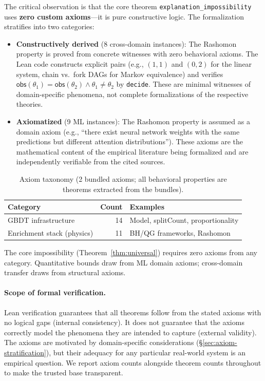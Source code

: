 \documentclass[11pt,a4paper]{article}
\begin{document}
The critical observation is that the core theorem
\texttt{explanation\_impossibility} uses \textbf{zero custom axioms}---it is pure
constructive logic.  The formalization stratifies into two categories:

\begin{itemize}
  \item \textbf{Constructively derived} (8 cross-domain instances): The
    Rashomon property is proved from concrete witnesses with zero behavioral
    axioms.  The Lean code constructs explicit pairs (e.g., $(1,1)$ and
    $(0,2)$ for the linear system, chain vs.\ fork DAGs for Markov
    equivalence) and verifies $\mathsf{obs}(\theta_1) = \mathsf{obs}(\theta_2)
    \wedge \theta_1 \ne \theta_2$ by \texttt{decide}.  These are minimal
    witnesses of domain-specific phenomena, not complete formalizations of the
    respective theories.

  \item \textbf{Axiomatized} (9 ML instances): The Rashomon property is
    assumed as a domain axiom (e.g., ``there exist neural network weights with
    the same predictions but different attention distributions'').  These
    axioms are the mathematical content of the empirical literature being
    formalized and are independently verifiable from the cited sources.
\end{itemize}

\begin{table}[h]
\centering
\small
\caption{Axiom taxonomy (2 bundled axioms; all behavioral properties are theorems extracted from the bundles).}
\label{tab:axiom-taxonomy}
\begin{tabular}{lrl}
\toprule
Category & Count & Examples \\
\midrule
GBDT infrastructure & 14 & Model, splitCount, proportionality \\
Enrichment stack (physics) & 11 & BH/QG frameworks, Rashomon \\
\bottomrule
\end{tabular}
\end{table}

\noindent The core impossibility (Theorem~\ref{thm:universal}) requires zero axioms from any category. Quantitative bounds draw from ML domain axioms; cross-domain transfer draws from structural axioms.

\paragraph{Scope of formal verification.}
Lean verification guarantees that all theorems follow from the stated axioms with no logical gaps (internal consistency). It does not guarantee that the axioms correctly model the phenomena they are intended to capture (external validity). The axioms are motivated by domain-specific considerations (\S\ref{sec:axiom-stratification}), but their adequacy for any particular real-world system is an empirical question. We report axiom counts alongside theorem counts throughout to make the trusted base transparent.
\end{document}
